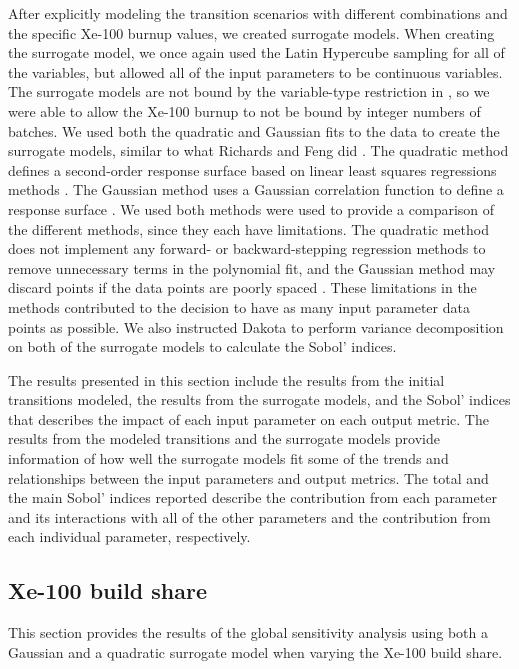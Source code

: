 After explicitly modeling the transition scenarios with different 
combinations and the specific Xe-100 burnup values, we 
created surrogate models. 
When creating the surrogate model, we once again used the Latin Hypercube 
sampling 
for all of the variables, but allowed all of the input parameters to be 
continuous variables. The surrogate models are not bound by 
the variable-type restriction in \Cyclus, so we were able to allow 
the Xe-100 burnup to not be bound by integer numbers of batches. 
We used both the quadratic and Gaussian fits to the data 
to create the surrogate models, similar to what Richards and 
Feng did \cite{richards_application_2021}. The quadratic method defines a 
second-order response surface based on linear least squares regressions methods 
\cite{adams_dakota_2021}. The Gaussian method uses a Gaussian correlation function 
to define a response surface \cite{adams_dakota_2021}. We used both methods were 
used to provide a comparison of the different methods, since they each have
limitations. 
The quadratic method does not implement any forward- or backward-stepping regression 
methods to remove unnecessary terms in the polynomial fit, and the Gaussian method 
may discard points if the data points are poorly spaced \cite{adams_dakota_2021}.
These limitations in the methods contributed to the decision to have as many 
input parameter data points as possible. 
We also instructed Dakota to perform variance decomposition 
on both of the surrogate models to calculate the Sobol' indices.

The results presented in this section include the results from the initial 
transitions modeled, the results from the surrogate models, and the Sobol' indices 
that describes the impact of each input parameter on each output metric. The 
results from the modeled transitions and the surrogate models provide 
information of how well the surrogate models fit some of the trends and 
relationships 
between the input parameters and output metrics. 
The total and the main Sobol' indices reported describe the contribution 
from each parameter and its interactions with all of the other parameters 
and the contribution from each individual parameter, respectively. 

\subsection{Xe-100 build share}
This section provides the results of the global sensitivity analysis using 
both a Gaussian and a quadratic surrogate model when varying the Xe-100 build 
share. 

